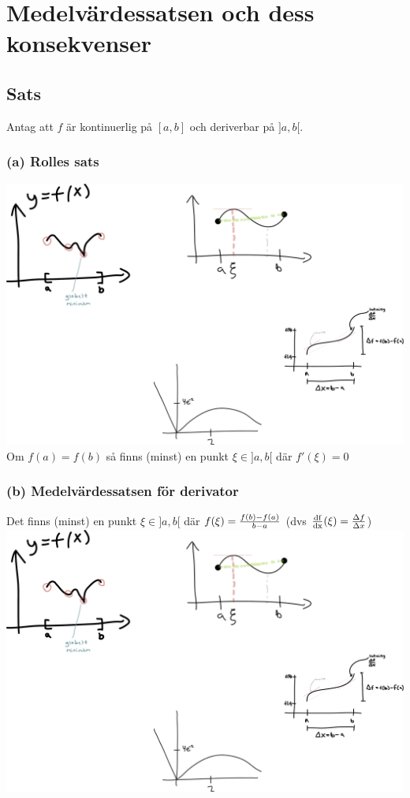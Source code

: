\documentclass{article}
\begin{document}
\section{Medelvärdessatsen och dess konsekvenser}
\subsection{Sats}
Antag att $f$ är kontinuerlig på $[a,b]$ och deriverbar på $]a,b[$.\\

\subsubsection{(a) Rolles sats}
\includegraphics[scale=0.2]{img/graph2.pdf}\\
Om $f(a)=f(b)$ så finns (minst) en punkt $\xi\in ]a,b[$ där $f'(\xi) = 0$

\subsubsection{(b) Medelvärdessatsen för derivator}
Det finns (minst) en punkt $\xi\in ]a,b[$ där $f(\xi)=\frac{f(b)-f(a)}{b-a}$
(dvs $\operatorname{\frac{df}{dx}} (\xi) = \frac{\Delta f}{\Delta x}$)
\includegraphics[scale=0.5]{img/graph3.pdf}\\
\end{document}
